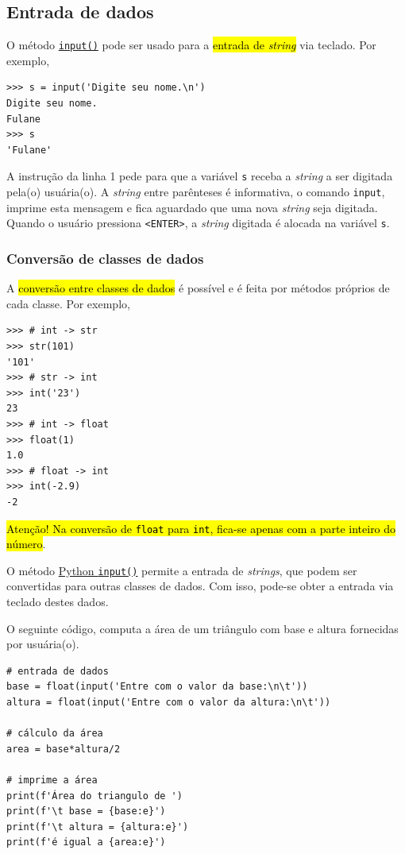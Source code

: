 \subsection{Entrada de dados}

O método \href{https://docs.python.org/3/library/functions.html\#input}{\lstinline+input()+} pode ser usado para a \hl{entrada de \textit{string}} via teclado. Por exemplo,

\begin{lstlisting}
>>> s = input('Digite seu nome.\n')
Digite seu nome.
Fulane
>>> s
'Fulane'
\end{lstlisting}

A instrução da linha 1 pede para que a variável \lstinline+s+ receba a \textit{string} a ser digitada pela(o) usuária(o). A \textit{string} entre parênteses é informativa, o comando \lstinline+input+, imprime esta mensagem e fica aguardado que uma nova \textit{string} seja digitada. Quando o usuário pressiona \lstinline+<ENTER>+, a \textit{string} digitada é alocada na variável \lstinline+s+.

\subsubsection{Conversão de classes de dados}

A \hl{conversão entre classes de dados} é possível e é feita por métodos próprios de cada classe. Por exemplo,

\begin{lstlisting}
>>> # int -> str
>>> str(101)
'101'
>>> # str -> int
>>> int('23')
23
>>> # int -> float
>>> float(1)
1.0
>>> # float -> int
>>> int(-2.9)
-2
\end{lstlisting}

\hl{Atenção! Na conversão de \texttt{float} para \texttt{int}, fica-se apenas com a parte inteiro do número}.

\begin{obs}
  O método \href{https://docs.python.org/3/library/functions.html}{Python \lstinline+input()+} permite a entrada de \textit{strings}, que podem ser convertidas para outras classes de dados. Com isso, pode-se obter a entrada via teclado destes dados.
\end{obs}

\begin{ex}
  O seguinte código, computa a área de um triângulo com base e altura fornecidas por usuária(o).

\begin{lstlisting}
# entrada de dados
base = float(input('Entre com o valor da base:\n\t'))
altura = float(input('Entre com o valor da altura:\n\t'))

# cálculo da área
area = base*altura/2

# imprime a área
print(f'Área do triangulo de ')
print(f'\t base = {base:e}')
print(f'\t altura = {altura:e}')
print(f'é igual a {area:e}')
\end{lstlisting}

\end{ex}

